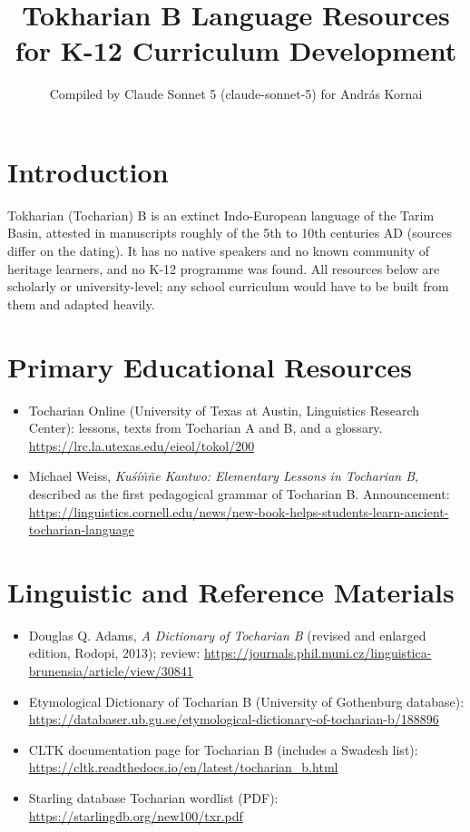 \documentclass[12pt]{article}
\title{Tokharian B Language Resources for K-12 Curriculum Development}
\author{Compiled by Claude Sonnet 5 (claude-sonnet-5) for Andr\'as Kornai}
\date{}
\begin{document}
\maketitle

\section{Introduction}
Tokharian (Tocharian) B is an extinct Indo-European language of the Tarim Basin, attested in manuscripts roughly of the 5th to 10th centuries AD (sources differ on the dating). It has no native speakers and no known community of heritage learners, and no K-12 programme was found. All resources below are scholarly or university-level; any school curriculum would have to be built from them and adapted heavily.

\section{Primary Educational Resources}
\begin{itemize}
\item Tocharian Online (University of Texas at Austin, Linguistics Research Center): lessons, texts from Tocharian A and B, and a glossary. \url{https://lrc.la.utexas.edu/eieol/tokol/200}
\item Michael Weiss, \emph{Kuś\'i\~n\~ne Kantwo: Elementary Lessons in Tocharian B}, described as the first pedagogical grammar of Tocharian B. Announcement: \url{https://linguistics.cornell.edu/news/new-book-helps-students-learn-ancient-tocharian-language}
\end{itemize}

\section{Linguistic and Reference Materials}
\begin{itemize}
\item Douglas Q. Adams, \emph{A Dictionary of Tocharian B} (revised and enlarged edition, Rodopi, 2013); review: \url{https://journals.phil.muni.cz/linguistica-brunensia/article/view/30841}
\item Etymological Dictionary of Tocharian B (University of Gothenburg database): \url{https://databaser.ub.gu.se/etymological-dictionary-of-tocharian-b/188896}
\item CLTK documentation page for Tocharian B (includes a Swadesh list): \url{https://cltk.readthedocs.io/en/latest/tocharian_b.html}
\item Starling database Tocharian wordlist (PDF): \url{https://starlingdb.org/new100/txr.pdf}
\end{itemize}
\end{document}
